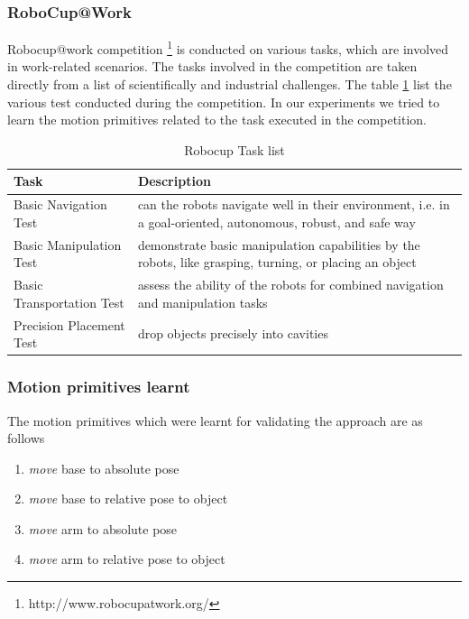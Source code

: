 \subsubsection{RoboCup@Work}
Robocup@work competition \footnote{http://www.robocupatwork.org/} is conducted on various tasks, which are involved in work-related scenarios.
The tasks involved in the competition are taken directly from a list of scientifically and industrial
challenges. The table \ref{robocup task} list the various test conducted during the competition. In our
experiments we tried to learn the motion primitives related to the task executed in the competition.
\begin{table}[htdp]
    \begin{center}
\begin{tabular}{|l|p{8cm}|}
    \hline
    \textbf{Task} & \textbf{Description}\\
    \hline
    Basic Navigation Test &  can the robots navigate well in their environment, i.e. in a goal-oriented, autonomous, robust, and safe way\\
    \hline
    Basic Manipulation Test& demonstrate basic manipulation capabilities by the robots, like grasping, turning, or placing an object\\
    \hline
    Basic Transportation Test &  assess the ability of the robots for combined navigation and manipulation tasks\\
    \hline
    Precision Placement Test  &  drop objects precisely into cavities\\
    \hline
\end{tabular}
\end{center}

\caption{Robocup Task list}
\label{robocup task}
\end{table}

\subsubsection{Motion primitives learnt }
The motion primitives which were learnt for validating the approach are as follows
\begin{enumerate}
    \item \textit{move} base to absolute pose
    \item \textit{move} base to relative pose to object
    \item \textit{move} arm to absolute pose
    \item \textit{move} arm to relative pose to object
\end{enumerate}

